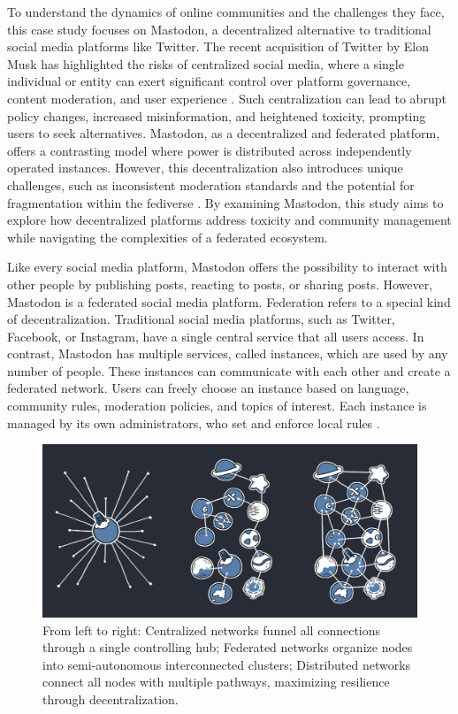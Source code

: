 To understand the dynamics of online communities and the challenges they face, this case study focuses on Mastodon, a decentralized alternative to traditional social media platforms like Twitter. The recent acquisition of Twitter by Elon Musk has highlighted the risks of centralized social media, where a single individual or entity can exert significant control over platform governance, content moderation, and user experience \cite{zia:2023}. Such centralization can lead to abrupt policy changes, increased misinformation, and heightened toxicity, prompting users to seek alternatives. Mastodon, as a decentralized and federated platform, offers a contrasting model where power is distributed across independently operated instances. However, this decentralization also introduces unique challenges, such as inconsistent moderation standards and the potential for fragmentation within the fediverse \cite{zia:2023}. By examining Mastodon, this study aims to explore how decentralized platforms address toxicity and community management while navigating the complexities of a federated ecosystem.

Like every social media platform, Mastodon offers the possibility to interact with other people by publishing posts, reacting to posts, or sharing posts. However, Mastodon is a federated social media platform. Federation refers to a special kind of decentralization. Traditional social media platforms, such as Twitter, Facebook, or Instagram, have a single central service that all users access. In contrast, Mastodon has multiple services, called instances, which are used by any number of people. These instances can communicate with each other and create a federated network. Users can freely choose an instance based on language, community rules, moderation policies, and topics of interest. Each instance is managed by its own administrators, who set and enforce local rules \cite{mastodon:docs}.

\begin{figure}[tb]
    \centering
    \includegraphics[width=\textwidth]{../material/network_models.jpg}
    \caption{From left to right: Centralized networks funnel all connections through a single controlling hub; Federated networks organize nodes into semi-autonomous interconnected clusters; Distributed networks connect all nodes with multiple pathways, maximizing resilience through decentralization. \cite{mastodon:docs}}
    \label{fig:network-models}
\end{figure}

